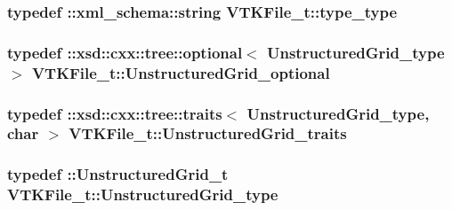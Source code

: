 \subsubsection[{\texorpdfstring{type\+\_\+type}{type_type}}]{\setlength{\rightskip}{0pt plus 5cm}typedef \+::{\bf xml\+\_\+schema\+::string} {\bf V\+T\+K\+File\+\_\+t\+::type\+\_\+type}}\hypertarget{classVTKFile__t_ac1f3484e4fde414849ede43a00955f76}{}\label{classVTKFile__t_ac1f3484e4fde414849ede43a00955f76}
\subsubsection[{\texorpdfstring{Unstructured\+Grid\+\_\+optional}{UnstructuredGrid_optional}}]{\setlength{\rightskip}{0pt plus 5cm}typedef \+::xsd\+::cxx\+::tree\+::optional$<$ {\bf Unstructured\+Grid\+\_\+type} $>$ {\bf V\+T\+K\+File\+\_\+t\+::\+Unstructured\+Grid\+\_\+optional}}\hypertarget{classVTKFile__t_ada5bb5a706e03ef1ab2ed1513ea83833}{}\label{classVTKFile__t_ada5bb5a706e03ef1ab2ed1513ea83833}
\subsubsection[{\texorpdfstring{Unstructured\+Grid\+\_\+traits}{UnstructuredGrid_traits}}]{\setlength{\rightskip}{0pt plus 5cm}typedef \+::xsd\+::cxx\+::tree\+::traits$<$ {\bf Unstructured\+Grid\+\_\+type}, char $>$ {\bf V\+T\+K\+File\+\_\+t\+::\+Unstructured\+Grid\+\_\+traits}}\hypertarget{classVTKFile__t_a02772a5f713678f02e94188d6a552528}{}\label{classVTKFile__t_a02772a5f713678f02e94188d6a552528}
\subsubsection[{\texorpdfstring{Unstructured\+Grid\+\_\+type}{UnstructuredGrid_type}}]{\setlength{\rightskip}{0pt plus 5cm}typedef \+::{\bf Unstructured\+Grid\+\_\+t} {\bf V\+T\+K\+File\+\_\+t\+::\+Unstructured\+Grid\+\_\+type}}\hypertarget{classVTKFile__t_a34ea02f6804e701657f11a8dc3851951}{}\label{classVTKFile__t_a34ea02f6804e701657f11a8dc3851951}
